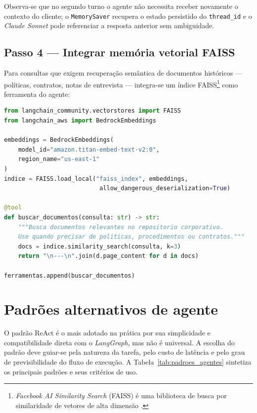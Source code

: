 Observa-se que no segundo turno o agente n\~ao necessita receber
novamente o contexto do cliente; o \texttt{MemorySaver} recupera o
estado persistido do \texttt{thread\_id} e o \textit{Claude Sonnet}
pode referenciar a resposta anterior sem ambiguidade.

\subsection{Passo 4 --- Integrar mem\'oria vetorial FAISS}

Para consultas que exigem recupera\c{c}\~ao sem\^antica de documentos
hist\'oricos --- pol\'iticas, contratos, notas de entrevista ---
integra-se um \'indice FAISS\footnote{%
  \textit{Facebook AI Similarity Search} (FAISS) \'e uma
  biblioteca de busca por similaridade de vetores de alta dimens\~ao
  \cite{johnson2019billion}.} como ferramenta do agente:

\begin{lstlisting}[language=Python,
  caption={Recupera\c{c}\~ao sem\^antica via FAISS integrada como ferramenta.},
  label={lst:faiss_tool}]
from langchain_community.vectorstores import FAISS
from langchain_aws import BedrockEmbeddings

embeddings = BedrockEmbeddings(
    model_id="amazon.titan-embed-text-v2:0",
    region_name="us-east-1"
)
indice = FAISS.load_local("faiss_index", embeddings,
                           allow_dangerous_deserialization=True)

@tool
def buscar_documentos(consulta: str) -> str:
    """Busca documentos relevantes no repositorio corporativo.
    Use quando precisar de politicas, procedimentos ou contratos."""
    docs = indice.similarity_search(consulta, k=3)
    return "\n---\n".join(d.page_content for d in docs)

ferramentas.append(buscar_documentos)
\end{lstlisting}

\section{Padr\~oes alternativos de agente}
\label{sec:padroes_agentes}

O padr\~ao ReAct \'e o mais adotado na pr\'atica por sua simplicidade
e compatibilidade direta com o \textit{LangGraph}, mas n\~ao \'e
universal. A escolha do padr\~ao deve guiar-se pela natureza da tarefa,
pelo custo de lat\^encia e pelo grau de previsibilidade do fluxo de
execu\c{c}\~ao. A Tabela~\ref{tab:padroes_agentes} sintetiza os
principais padr\~oes e seus crit\'erios de uso.

